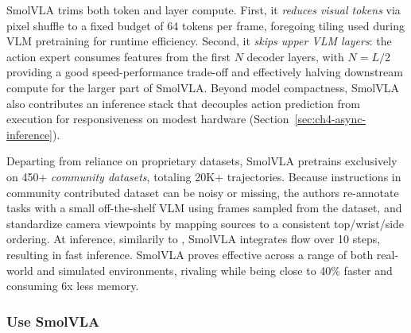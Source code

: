 SmolVLA trims both token and layer compute. 
First, it \emph{reduces visual tokens} via pixel shuffle to a fixed budget of 64 tokens per frame, foregoing tiling used during VLM pretraining for runtime efficiency. 
Second, it \emph{skips upper VLM layers}: the action expert consumes features from the first \(N\) decoder layers, with \(N=L/2\) providing a good speed-performance trade-off and effectively halving downstream compute for the larger part of SmolVLA.
Beyond model compactness, SmolVLA also contributes an inference stack that decouples action prediction from execution for responsiveness on modest hardware (Section~\ref{sec:ch4-async-inference}).

Departing from reliance on proprietary datasets, SmolVLA pretrains exclusively on 450+ \emph{community datasets}, totaling 20K+ trajectories. 
Because instructions in community contributed dataset can be noisy or missing, the authors re-annotate tasks with a small off-the-shelf VLM using frames sampled from the dataset, and standardize camera viewpoints by mapping sources to a consistent top/wrist/side ordering.
At inference, similarily to \pizero, SmolVLA integrates flow over 10 steps, resulting in fast inference.
SmolVLA proves effective across a range of both real-world and simulated environments, rivaling \pizero while being close to 40\% faster and consuming 6x less memory.

\subsubsection{Use SmolVLA}

